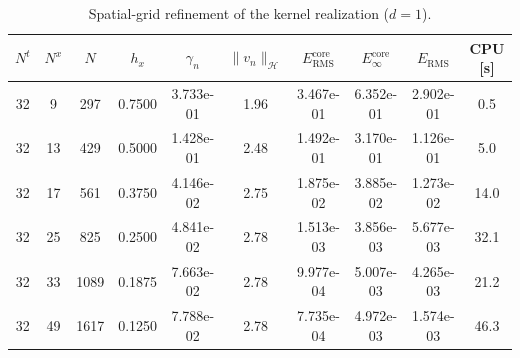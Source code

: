 \begin{table}[tb]
  \centering
  \small
  \caption{Spatial-grid refinement of the kernel realization ($d=1$).}
  \label{tab:ker.refine_d1}
  \begin{tabular}{cccccccccc}
    \toprule
    $N^t$ & $N^x$ & $N$ & $h_x$ & $\gamma_n$ & $\|v_n\|_{\mathcal H}$ & $E_{\mathrm{RMS}}^{\mathrm{core}}$ & $E_{\infty}^{\mathrm{core}}$ & $E_{\mathrm{RMS}}$ & CPU [s] \\
    \midrule
    32 & 9 & 297 & 0.7500 & 3.733e-01 & 1.96 & 3.467e-01 & 6.352e-01 & 2.902e-01 & 0.5 \\
    32 & 13 & 429 & 0.5000 & 1.428e-01 & 2.48 & 1.492e-01 & 3.170e-01 & 1.126e-01 & 5.0 \\
    32 & 17 & 561 & 0.3750 & 4.146e-02 & 2.75 & 1.875e-02 & 3.885e-02 & 1.273e-02 & 14.0 \\
    32 & 25 & 825 & 0.2500 & 4.841e-02 & 2.78 & 1.513e-03 & 3.856e-03 & 5.677e-03 & 32.1 \\
    32 & 33 & 1089 & 0.1875 & 7.663e-02 & 2.78 & 9.977e-04 & 5.007e-03 & 4.265e-03 & 21.2 \\
    32 & 49 & 1617 & 0.1250 & 7.788e-02 & 2.78 & 7.735e-04 & 4.972e-03 & 1.574e-03 & 46.3 \\
    \bottomrule
  \end{tabular}
\end{table}
